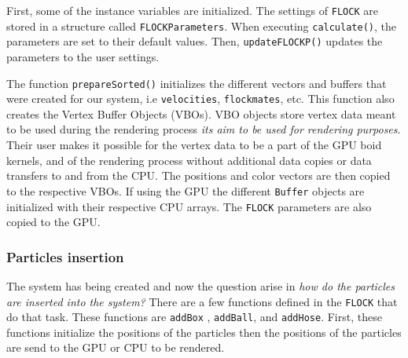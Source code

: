 
First, some of the instance variables are initialized. 
The settings of \texttt{FLOCK} are stored in a structure called 
\texttt{FLOCKParameters}. 
When executing \texttt{calculate()}, the parameters 
are set to their default values. Then, \texttt{updateFLOCKP()} 
updates the parameters to the user settings. 


The function \texttt{prepareSorted()} initializes the different vectors 
and buffers that were created for our system, i.e \texttt{velocities}, 
\texttt{flockmates}, etc. This function also creates the Vertex Buffer Objects 
(VBOs). VBO objects store vertex data meant to be used during the rendering
process {\em its aim to be used for rendering purposes}\cite{vbo}. Their 
user makes it possible for the vertex data to be a part of the GPU boid 
kernels, and of the rendering process without additional data copies or data
transfers to and from the CPU. The positions and color vectors are 
then copied to the respective VBOs. If using the GPU the different \texttt{Buffer} objects are initialized with their respective CPU arrays. The \texttt{FLOCK} parameters are also copied to the GPU. 


\subsubsection{Particles insertion}
The system has being created and now the question arise in \textit{how do the particles are inserted into the system?} There are a few functions defined in the \texttt{FLOCK} that do that task. These functions are \texttt{addBox} , \texttt{addBall}, and \texttt{addHose}. First, these functions initialize the positions of the particles then the positions of the particles are send to the GPU or CPU to be rendered. 

